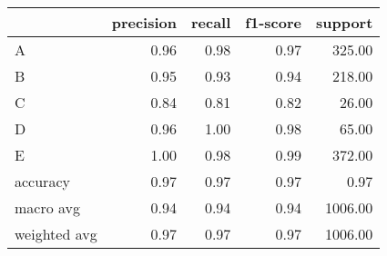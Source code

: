 \begin{tabular}{|l|r|r|r|r|}
\hline
{} &  precision &  recall &  f1-score &  support \\
\hline
A            &       0.96 &    0.98 &      0.97 &   325.00 \\
B            &       0.95 &    0.93 &      0.94 &   218.00 \\
C            &       0.84 &    0.81 &      0.82 &    26.00 \\
D            &       0.96 &    1.00 &      0.98 &    65.00 \\
E            &       1.00 &    0.98 &      0.99 &   372.00 \\
accuracy     &       0.97 &    0.97 &      0.97 &     0.97 \\
macro avg    &       0.94 &    0.94 &      0.94 &  1006.00 \\
weighted avg &       0.97 &    0.97 &      0.97 &  1006.00 \\
\hline
\end{tabular}
